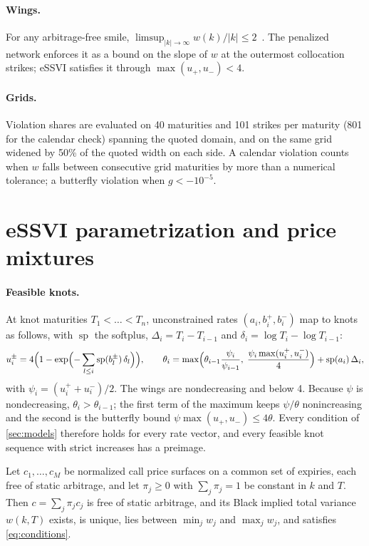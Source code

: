 \paragraph{Wings.} For any arbitrage-free smile, $\limsup_{|k|\to\infty}w(k)/|k|\le2$~\citep{lee2004}.
The penalized network enforces it as a bound on the slope of $w$ at the outermost collocation
strikes; eSSVI satisfies it through $\max(u_+,u_-)<4$.

\paragraph{Grids.} Violation shares are evaluated on 40 maturities and 101 strikes per maturity (801
for the calendar check) spanning the quoted domain, and on the same grid widened by 50\% of the
quoted width on each side. A calendar violation counts when $w$ falls between consecutive grid
maturities by more than a numerical tolerance; a butterfly violation when $g<-10^{-5}$.

\section{eSSVI parametrization and price mixtures}
\label{app:essvi}

\paragraph{Feasible knots.} At knot maturities $T_1<\dots<T_n$, unconstrained rates
$(a_i,b_i^+,b_i^-)$ map to knots as follows, with $\operatorname{sp}$ the softplus,
$\Delta_i=T_i-T_{i-1}$ and $\delta_i=\log T_i-\log T_{i-1}$:
\[
  u^\pm_i=4\Bigl(1-\exp\Bigl(-\sum_{l\le i}\operatorname{sp}(b^\pm_l)\,\delta_l\Bigr)\Bigr),\qquad
  \theta_i=\max\Bigl(\theta_{i-1}\frac{\psi_i}{\psi_{i-1}},\;\frac{\psi_i\max(u^+_i,u^-_i)}{4}\Bigr)+\operatorname{sp}(a_i)\,\Delta_i,
\]
with $\psi_i=(u^+_i+u^-_i)/2$. The wings are nondecreasing and below 4. Because $\psi$ is
nondecreasing, $\theta_i>\theta_{i-1}$; the first term of the maximum keeps $\psi/\theta$
nonincreasing and the second is the butterfly bound $\psi\max(u_+,u_-)\le4\theta$. Every condition
of \cref{sec:models} therefore holds for every rate vector, and every feasible knot sequence with
strict increases has a preimage.

\begin{proposition}
\label{prop:mixture}
Let $c_1,\dots,c_M$ be normalized call price surfaces on a common set of expiries, each free of static
arbitrage, and let $\pi_j\ge0$ with $\sum_j\pi_j=1$ be constant in $k$ and $T$. Then
$c=\sum_j\pi_jc_j$ is free of static arbitrage, and its Black implied total variance $w(k,T)$ exists,
is unique, lies between $\min_j w_j$ and $\max_j w_j$, and satisfies \cref{eq:conditions}.
\end{proposition}

